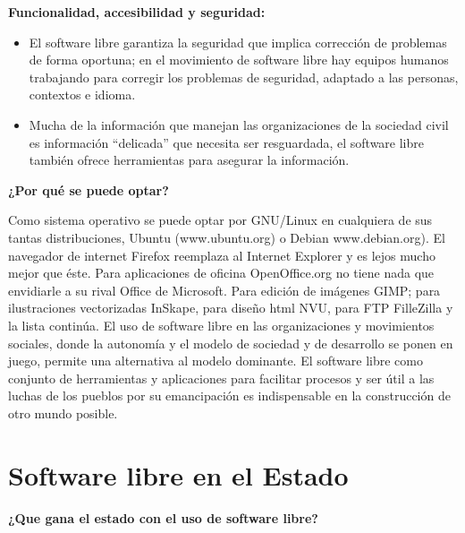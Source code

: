 {\bf Funcionalidad, accesibilidad y seguridad:}
\begin{itemize}
\item El software libre garantiza la seguridad que implica corrección de problemas de forma oportuna; en el movimiento de software libre hay equipos humanos trabajando para corregir los problemas de seguridad, adaptado a las personas, contextos e idioma.
\item   Mucha de la información que manejan las organizaciones de la sociedad civil es
información “delicada” que necesita ser resguardada, el software libre también ofrece herramientas para asegurar la información.
\end{itemize}

{\bf ¿Por qué se puede optar?}

Como sistema operativo se puede optar por GNU/Linux en cualquiera de sus tantas distribuciones, Ubuntu (www.ubuntu.org) o Debian www.debian.org).
El navegador de internet Firefox reemplaza al Internet Explorer y es lejos mucho mejor que éste. Para aplicaciones de oficina OpenOffice.org no tiene nada que envidiarle a su rival Office de Microsoft. Para edición de imágenes GIMP; para ilustraciones vectorizadas InSkape, para diseño html NVU, para FTP FilleZilla y la lista continúa.
El uso de software libre en las organizaciones y movimientos sociales, donde la autonomía y el modelo de sociedad y de desarrollo se ponen en juego, permite una alternativa al modelo dominante. El software libre como conjunto de herramientas y aplicaciones para facilitar procesos y ser útil a las luchas de los pueblos por su emancipación es indispensable en la construcción de otro mundo posible.

\section{Software libre en el Estado}
 {\bf¿Que gana el estado con el uso de software libre?}
 
